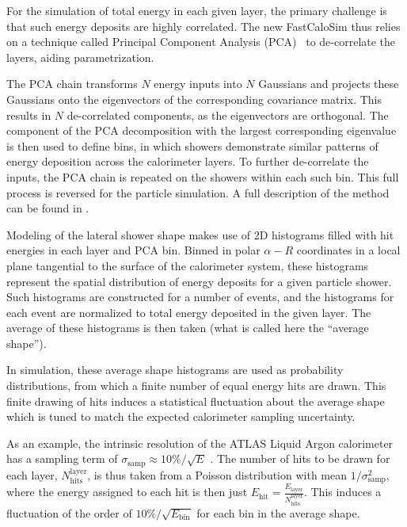 For the simulation of total energy in each given layer, the primary challenge is that such energy deposits are highly correlated. The new FastCaloSim thus relies on a technique called Principal Component Analysis (PCA)~\cite{TPrincipal} to de-correlate the layers, aiding parametrization.

The PCA chain transforms $N$ energy inputs into $N$ Gaussians and projects these Gaussians onto the eigenvectors of the corresponding covariance matrix. This results in $N$ de-correlated components, as the eigenvectors are orthogonal. The component of the PCA decomposition with the largest corresponding eigenvalue is then used to define bins, in which showers demonstrate similar patterns of energy deposition across the calorimeter layers. To further de-correlate the inputs, the PCA chain is repeated on the showers within each such bin. This full process is reversed for the particle simulation. A full description of the method can be found in \cite{ATL-SOFT-PUB-2018-002}.

Modeling of the lateral shower shape makes use of 2D histograms filled with \GEANT hit energies in each layer and PCA bin.
Binned in polar $\alpha-R$ coordinates in a local plane tangential to the surface of the calorimeter system, these histograms 
represent the spatial distribution of energy deposits for a given particle shower. Such histograms are constructed for a 
number of \GEANT events, and the histograms for each event are normalized to total energy deposited in the given layer. The 
average of these histograms is then taken (what is called here the ``average shape'').

In simulation, these average shape histograms are used as probability distributions, from which a finite number of equal 
energy hits are drawn. This finite drawing of hits induces a statistical fluctuation about the average shape which is tuned 
to match the expected calorimeter sampling uncertainty.

As an example, the intrinsic resolution of the ATLAS Liquid Argon calorimeter has a sampling term of 
$\sigma_{\text{samp}} \approx 10\%/\sqrt{E}$ \cite{SamplingCalo}. The number of hits to be drawn for each layer, 
$N_{\text{hits}}^{\text{layer}}$, is thus taken from a Poisson distribution with mean $1/\sigma_{\text{samp}}^2$, where the 
energy assigned to each hit is then just $E_{\text{hit}} = \frac{E_{\text{layer}}}{N_{\text{hits}}^{\text{layer}}}$. This 
induces a fluctuation of the order of $10\%/\sqrt{E_{\text{bin}}}$ for each bin in the average shape.

